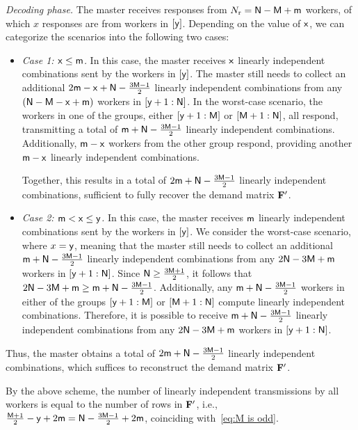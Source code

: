 \documentclass[conference,letterpaper]{IEEEtran}
\begin{document}
  
  {\it Decoding phase.}
The master receives responses from $N_{\rm r} = {\sf N} - {\sf M} + {\sf m}$ workers, of which $x$ responses are from workers in $[{\sf y}]$. Depending on the value of ${\sf x}$, we can categorize the scenarios into the following two cases:
\begin{itemize}
\item {\it Case 1: ${\sf x} \leq {\sf m}$.} In this case, the master receives ${\sf x}$ linearly independent combinations sent by the workers in $[{\sf y}]$. The master still needs to collect an additional $2{\sf m} - {\sf x} + {\sf N} - \frac{3{\sf M} - 1}{2}$ linearly independent combinations from any $({\sf N} - {\sf M} - {\sf x} + {\sf m})$ workers in $[{\sf y} + 1 : {\sf N}]$.
In the worst-case scenario, the workers in one of the groups, either $[{\sf y} + 1 : {\sf M}]$ or $[{\sf M} + 1 : {\sf N}]$, all respond, transmitting a total of ${\sf m} + {\sf N} - \frac{3{\sf M} - 1}{2}$ linearly independent combinations. Additionally, ${\sf m} - {\sf x}$ workers from the other group respond, providing another ${\sf m} - {\sf x}$ linearly independent combinations. 

Together, this results in a total of $2{\sf m} + {\sf N} - \frac{3{\sf M} - 1}{2}$ linearly independent combinations, sufficient to fully recover the demand matrix ${\bf F}'$.

\item {\it Case 2: ${\sf m} < {\sf x} \leq {\sf y}$.} In this case, the master receives ${\sf m}$ linearly independent combinations sent by the workers in $[{\sf y}]$. We consider the worst-case scenario, where $x = {\sf y}$, meaning that the master still needs to collect an additional ${\sf m} + {\sf N} - \frac{3{\sf M} - 1}{2}$ linearly independent combinations from any $2{\sf N} - 3{\sf M} + {\sf m}$ workers in $[{\sf y} + 1 : {\sf N}]$.
Since ${\sf N} \geq \frac{3{\sf M} + 1}{2}$, it follows that $2{\sf N} - 3{\sf M} + {\sf m} \geq {\sf m} + {\sf N} - \frac{3{\sf M} - 1}{2}$. Additionally, any ${\sf m} + {\sf N} - \frac{3{\sf M} - 1}{2}$ workers in either of the groups $[{\sf y} + 1 : {\sf M}]$ or $[{\sf M} + 1 : {\sf N}]$ compute linearly independent combinations. Therefore, it is possible to receive ${\sf m} + {\sf N} - \frac{3{\sf M} - 1}{2}$ linearly independent combinations from any $2{\sf N} - 3{\sf M} + {\sf m}$ workers in $[{\sf y} + 1 : {\sf N}]$.
\end{itemize}
Thus, the master obtains a total of $2{\sf m} + {\sf N} - \frac{3{\sf M} - 1}{2}$ linearly independent combinations, which suffices to reconstruct the demand matrix ${\bf F}'$.

 By the above scheme,  the number of linearly independent transmissions by all workers is equal to the number of rows in ${\bf F}'$, i.e.,
$\frac{{\sf M}+1}{2}-{\sf y}+2{\sf m} ={\sf N}- \frac{3{\sf M}-1}{2}+2{\sf m} $, coinciding with~\eqref{eq:M is odd}.
\end{document}

